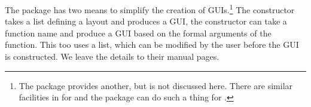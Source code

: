The  package has two means to simplify the creation of
GUIs.\footnote{The  package provides another, but is not
  discussed here. There are similar facilities in  for
   and the  package can do such a thing for
  .}  The  constructor takes a list
defining a layout and produces a GUI, the 
constructor can take a function name and produce a GUI based on the
formal arguments of the function. This too uses a list, which can be
modified by the user before the GUI is constructed. We leave the
details to their manual pages.









